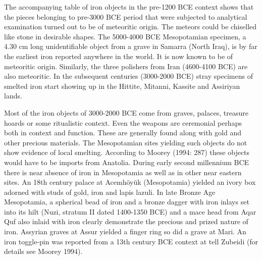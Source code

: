 
The accompanying table of iron objects in the pre-1200 BCE context shows that the pieces belonging to pre-3000 BCE period that were subjected to analytical examination turned out to be of meteoritic origin. The meteors could be chiselled like stone in desirable shapes. The 5000-4000 BCE Mesopotamian specimen, a 4.30 cm long unidentifiable object from a grave in Samarra (North Iraq), is by far the earliest iron reported anywhere in the world. It is now known to be of meteoritic origin. Similarly, the three polishers from Iran (4600-4100 BCE) are also meteoritic. In the subsequent centuries (3000-2000 BCE) stray specimens of smelted iron start showing up in the Hittite, Mitanni, Kassite and Assiriyan lands.

Most of the iron objects of 3000-2000 BCE come from graves, palaces, treasure hoards or some ritualistic context. Even the weapons are ceremonial perhaps both in context and function. These are generally found along with gold and other precious materials. The Mesopotamian sites yielding such objects do not show evidence of local smelting. According to Moorey (1994: 287) these objects would have to be imports from Anatolia. During early second millennium BCE there is near absence of iron in Mesopotamia as well as in other near eastern sites. An 18th century palace at Acemhöyük (Mesopotamia) yielded an ivory box adorned with studs of gold, iron and lapis lazuli. In late Bronze Age Mesopotamia, a spherical bead of iron and a bronze dagger with iron inlays set into its hilt (Nuzi, stratum II dated 1400-1350 BCE) and a mace head from Aqar Quf also inlaid with iron clearly demonstrate the precious and prized nature of iron. Assyrian graves at Assur yielded a finger ring so did a grave at Mari. An iron toggle-pin was reported from a 13th century BCE context at tell Zubeidi (for details see Moorey 1994).

